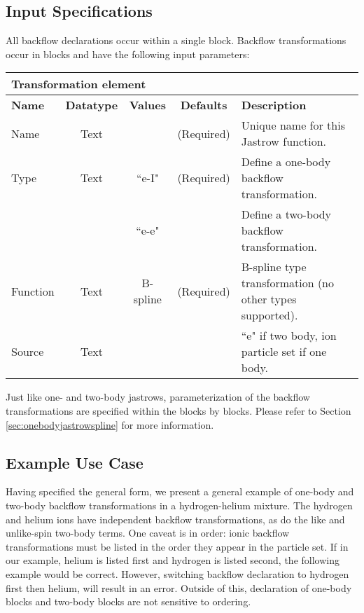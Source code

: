 \subsection{Input Specifications}
All backflow declarations occur within a single  block.  Backflow transformations occur in  blocks and have the following input parameters:

\begin{table}[h]
\begin{center}
\begin{tabular}{l c c c l }
\hline
\multicolumn{5}{l}{Transformation element} \\
\hline
\bfseries Name & \bfseries Datatype & \bfseries Values & \bfseries Defaults  & \bfseries Description \\
\hline
Name & Text &  & (Required) & Unique name for this Jastrow function. \\
Type & Text & ``e-I" & (Required) & Define a one-body backflow transformation. \\ 
        &          & ``e-e" & & Define a two-body backflow transformation. \\
Function & Text & B-spline & (Required) & B-spline type transformation (no other types supported). \\
Source & Text &  &  & ``e" if two body, ion particle set if one body.\\ 
  \hline
\end{tabular}
\end{center}
\end{table}

Just like one- and two-body jastrows, parameterization of the backflow transformations are specified within the  blocks by   blocks.  Please refer to Section \ref{sec:onebodyjastrowspline} for more information.

\subsection{Example Use Case}
Having specified the general form, we present a general example of one-body and two-body backflow transformations in a hydrogen-helium mixture.  The hydrogen and helium ions have independent backflow transformations, as do the like and unlike-spin two-body terms.  One caveat is in order:  ionic backflow transformations must be listed in the order they appear in the particle set.  If in our example, helium is listed first and hydrogen is listed second, the following example would be correct.  However, switching backflow declaration to hydrogen first then helium, will result in an error.  Outside of this, declaration of one-body blocks and two-body blocks are not sensitive to ordering.  


